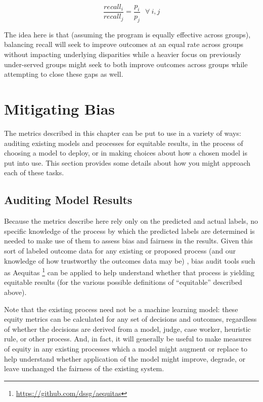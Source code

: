 \documentclass[]{krantz}
\begin{document}
\[\frac{recall_i}{recall_j} = \frac{p_i}{p_j}~~~\forall~i,j\]

The idea here is that (assuming the program is equally effective across
groups), balancing recall will seek to improve outcomes at an equal rate
across groups without impacting underlying disparities while a heavier
focus on previously under-served groups might seek to both improve
outcomes across groups while attempting to close these gaps as well.

\hypertarget{sec:applications}{\section{Mitigating
Bias}\label{sec:applications}}

The metrics described in this chapter can be put to use in a variety of
ways: auditing existing models and processes for equitable results, in
the process of choosing a model to deploy, or in making choices about
how a chosen model is put into use. This section provides some details
about how you might approach each of these tasks.

\subsection{Auditing Model Results}\label{auditing-model-results}

Because the metrics describe here rely only on the predicted and actual
labels, no specific knowledge of the process by which the predicted
labels are determined is needed to make use of them to assess bias and
fairness in the results. Given this sort of labeled outcome data for any
existing or proposed process (and our knowledge of how trustworthy the
outcomes data may be) , bias audit tools such as Aequitas \footnote{\url{https://github.com/dssg/aequitas}}
can be applied to help understand whether that process is yielding
equitable results (for the various possible definitions of ``equitable''
described above).

Note that the existing process need not be a machine learning model:
these equity metrics can be calculated for any set of decisions and
outcomes, regardless of whether the decisions are derived from a model,
judge, case worker, heuristic rule, or other process. And, in fact, it
will generally be useful to make measures of equity in any existing
processes which a model might augment or replace to help understand
whether application of the model might improve, degrade, or leave
unchanged the fairness of the existing system.
\end{document}
